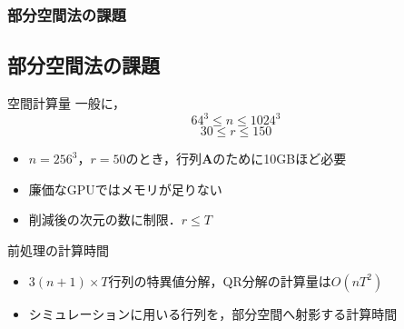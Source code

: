 \documentclass[aspectratio=169,dvipdfmx,hyperref={bookmarks=true}]{beamer}
\begin{document}


\begin{frame}
\frametitle{部分空間法の課題}
\subsection{部分空間法の課題}
	\begin{block}{空間計算量}
		一般に，
		\[64^3 \le n \le 1024^3\]
		\[30 \le r \le 150\]
   		\begin{itemize}
			\item $n = 256^3$，$r=50$のとき，行列$\bm{A}$のために10GBほど必要
			\item 廉価なGPUではメモリが足りない
   			\item 削減後の次元の数に制限．$r \le T$
		\end{itemize}
	\end{block}

	\begin{block}{前処理の計算時間}
 		\begin{itemize}
		\item $3(n +1)\times T$行列の特異値分解，QR分解の計算量は$O(nT^2)$
		\item	シミュレーションに用いる行列を，部分空間へ射影する計算時間
	\end{itemize}
	\end{block}
\end{frame}

\end{document}
